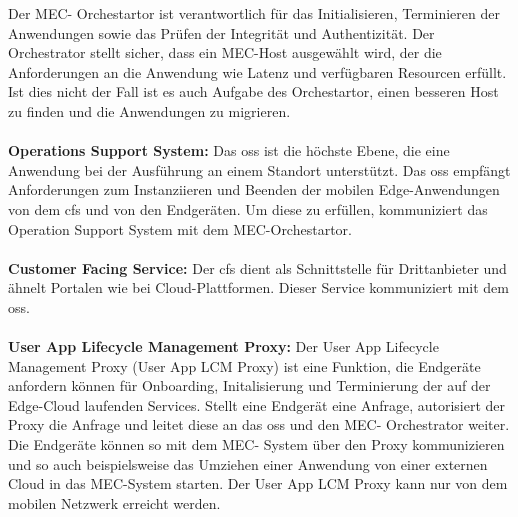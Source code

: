 \documentclass[runningheads]{llncs}
\numberwithin{figure}{section}
\begin{document}
Der MEC- Orchestartor ist verantwortlich für das Initialisieren, Terminieren der Anwendungen sowie das Prüfen
der Integrität und Authentizität. Der Orchestrator stellt sicher, 
dass ein MEC-Host ausgewählt wird, der die Anforderungen an die Anwendung wie Latenz und verfügbaren Resourcen erfüllt.
Ist dies nicht der Fall ist es auch Aufgabe des Orchestartor, einen besseren Host zu finden und die Anwendungen zu migrieren.
\\
\\
\textbf{Operations Support System:}
Das \acrfull{oss} ist die höchste Ebene, die eine Anwendung bei der Ausführung an einem Standort unterstützt. 
Das \acrshort{oss} empfängt Anforderungen zum Instanziieren und Beenden der mobilen Edge-Anwendungen von dem \acrfull{cfs} und von den Endgeräten.
Um diese zu erfüllen, kommuniziert das Operation Support System mit dem MEC-Orchestartor.
\\
\\
\textbf{Customer Facing Service:}
Der \acrfull{cfs} dient als Schnittstelle für Drittanbieter und ähnelt Portalen wie bei Cloud-Plattformen. 
Dieser Service kommuniziert mit dem \acrshort{oss}.
\\
\\
\textbf{User App Lifecycle Management Proxy:} 
Der User App Lifecycle Management Proxy (User App LCM Proxy) ist eine Funktion, die Endgeräte anfordern können für Onboarding, Initalisierung und Terminierung der auf der
Edge-Cloud laufenden Services. Stellt eine Endgerät eine Anfrage, autorisiert der Proxy die Anfrage und leitet diese an das \acrshort{oss} und den MEC- Orchestrator weiter. 
Die Endgeräte können so mit dem MEC- System über den Proxy kommunizieren und so auch beispielsweise das Umziehen einer Anwendung von 
einer externen Cloud in das MEC-System starten. Der User App LCM Proxy kann nur von dem mobilen Netzwerk erreicht werden.
\end{document}
